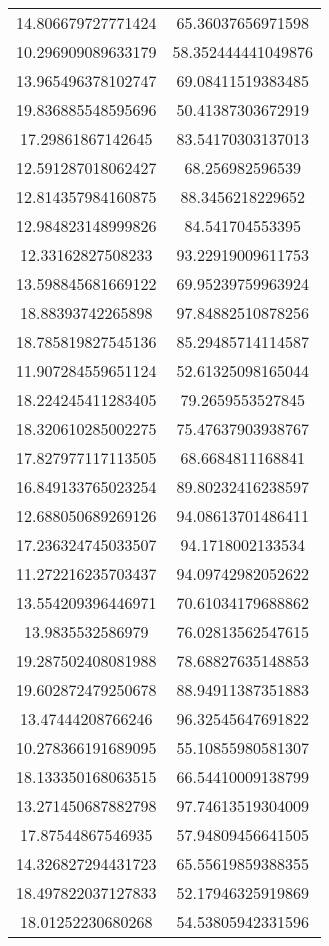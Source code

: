 \begin{table}
\begin{tabular}{cc}
14.806679727771424 & 65.36037656971598 \\
10.296909089633179 & 58.352444441049876 \\
13.965496378102747 & 69.08411519383485 \\
19.836885548595696 & 50.41387303672919 \\
17.29861867142645 & 83.54170303137013 \\
12.591287018062427 & 68.256982596539 \\
12.814357984160875 & 88.3456218229652 \\
12.984823148999826 & 84.541704553395 \\
12.33162827508233 & 93.22919009611753 \\
13.598845681669122 & 69.95239759963924 \\
18.88393742265898 & 97.84882510878256 \\
18.785819827545136 & 85.29485714114587 \\
11.907284559651124 & 52.61325098165044 \\
18.224245411283405 & 79.2659553527845 \\
18.320610285002275 & 75.47637903938767 \\
17.827977117113505 & 68.6684811168841 \\
16.849133765023254 & 89.80232416238597 \\
12.688050689269126 & 94.08613701486411 \\
17.236324745033507 & 94.1718002133534 \\
11.272216235703437 & 94.09742982052622 \\
13.554209396446971 & 70.61034179688862 \\
13.9835532586979 & 76.02813562547615 \\
19.287502408081988 & 78.68827635148853 \\
19.602872479250678 & 88.94911387351883 \\
13.47444208766246 & 96.32545647691822 \\
10.278366191689095 & 55.10855980581307 \\
18.133350168063515 & 66.54410009138799 \\
13.271450687882798 & 97.74613519304009 \\
17.87544867546935 & 57.94809456641505 \\
14.326827294431723 & 65.55619859388355 \\
18.497822037127833 & 52.17946325919869 \\
18.01252230680268 & 54.53805942331596 \\

\end{tabular}
\end{table}
